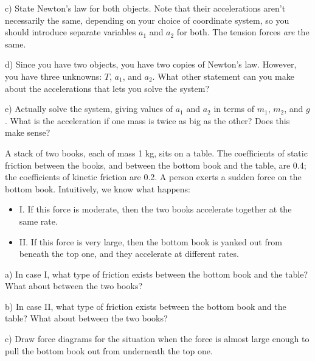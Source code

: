 \documentclass[12pt]{article}
\begin{document}
\vspace{2in}

c) State Newton's law for both objects. Note that their accelerations aren't necessarily the same, depending on your choice of coordinate system, so you should introduce separate variables $a_1$ and $a_2$ for both. The tension forces
{\it are} the same.

\newpage

d) Since you have two objects, you have two copies of Newton's law. However, you have three unknowns: $T$, $a_1$, and $a_2$. What other statement can you make about the accelerations that lets you solve the system?

\vspace{3in}

e) Actually solve the system, giving values of $a_1$ and $a_2$ in terms of $m_1$, $m_2$, and $g$. What is the acceleration if one mass is twice as big as the other? Does this make sense? 

\newpage

A stack of two books, each of mass 1 kg, sits on a table. The coefficients of static friction between the books, and between the bottom book and the table, are 0.4; the coefficients of kinetic friction are 0.2. A person exerts a sudden force on the bottom book. Intuitively, we know what happens:
\begin{itemize}
\item{I. If this force is moderate, then the two books accelerate together at the same rate.}
\item{II. If this force is very large, then the bottom book is yanked out from beneath the top one, and they accelerate at different rates.}
\end{itemize}

a) In case I, what type of friction exists between the bottom book and the table? What about between the two books?

\vspace{0.7in}

b) In case II, what type of friction exists between the bottom book and the table? What about between the two books?

\vspace{0.7in}

c) Draw force diagrams for the situation when the force is almost large enough to pull the bottom book out from underneath the top one.

\vspace{1.5in}
\end{document}
